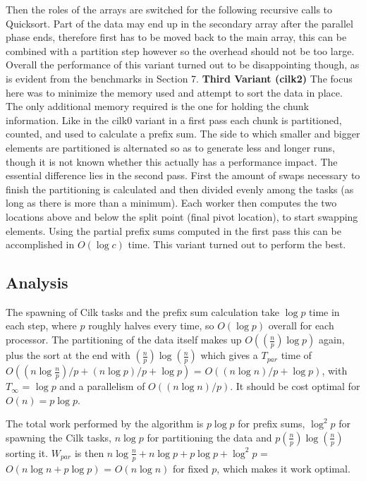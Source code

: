 \documentclass[12pt,a4paper]{article}
\begin{document}
Then the roles of the arrays are switched for the following recursive calls to Quicksort. Part of the data may end up in the secondary array after the parallel phase ends, therefore first has to be moved back to the main array, this can be combined with a partition step however so the overhead should not be too large. Overall the performance of this variant turned out to be disappointing though, as is evident from the benchmarks in Section 7.
\newline\newline
\textbf{Third Variant (cilk2)}\newline
The focus here was to minimize the memory used and attempt to sort the data in place. The only additional memory required is the one for holding the chunk information. Like in the cilk0 variant in a first pass each chunk is partitioned, counted, and used to calculate a prefix sum. The side to which smaller and bigger elements are partitioned is alternated so as to generate less and longer runs, though it is not known whether this actually has a performance impact. The essential difference lies in the second pass. First the amount of swaps necessary to finish the partitioning is calculated and then divided evenly among the tasks (as long as there is more than a minimum). Each worker then computes the two locations above and below the split point (final pivot location), to start swapping elements. Using the partial prefix sums computed in the first pass this can be accomplished in $O(\log c)$ time. This variant turned out to perform the best.
\subsection{Analysis}
The spawning of Cilk tasks and the prefix sum calculation take $\log p$ time in each step, where $p$ roughly halves every time, so $O(\log p)$ overall for each processor. The partitioning of the data itself makes up $O((\frac{n}{p})\log p)$ again, plus the sort at the end with $(\frac{n}{p})\log(\frac{n}{p})$ which gives a $T_{par}$ time of $O((n\log\frac{n}{p})/p + (n\log p)/p + \log p)$ = $O((n\log n)/p + \log p)$, with $T_{\infty}$ = $\log p$ and a parallelism of $O((n\log n)/p)$. It should be cost optimal for $O(n) = p\log p$. 

The total work performed by the algorithm is $p\log p$ for prefix sums, $\log^2 p$ for spawning the Cilk tasks, $n\log p$ for partitioning the data and $p(\frac{n}{p})\log(\frac{n}{p})$ sorting it. $W_{par}$ is then $n\log\frac{n}{p} + n\log p + p\log p + \log^2p$ = $O(n\log n + p\log p)$ = $O(n\log n)$ for fixed $p$, which makes it work optimal.
\end{document}
